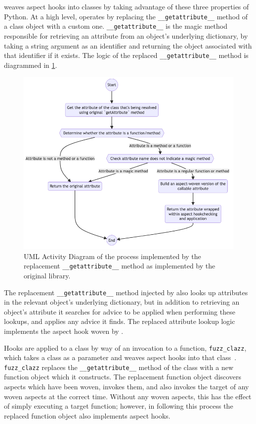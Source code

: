 \pdsf weaves aspect hooks into classes by taking advantage of these three
properties of Python. At a high level, \pdsf operates by replacing the
\lstinline{__getattribute__} method of a class object with a custom one.
\lstinline{__getattribute__} is the magic method responsible for retrieving an
attribute from an object's underlying dictionary, by taking a string argument as
an identifier and returning the object associated with that identifier if it
exists. The logic of the replaced \lstinline{__getattribute__} method is
diagrammed in \cref{fig:early_pdsf_replaced_getattr_diagram}.

\begin{figure}
\includegraphics[width=0.9\columnwidth]{30_prior_work/diagrams/replacement_getattr.png}
\caption{UML Activity Diagram of the process implemented by the replacement
\lstinline{__getattribute__} method as implemented by the original \pdsf{}
library.}
\label{fig:early_pdsf_replaced_getattr_diagram}
\end{figure}

The replacement \lstinline{__getattribute__} method injected by
\pdsf{} also looks up attributes in the relevant object's underlying dictionary,
but in addition to retrieving an object's attribute it searches for advice to be
applied when performing these lookups, and applies any advice it finds. The
replaced attribute lookup logic implements the aspect hook woven by \pdsf{}.

Hooks are applied to a class by way of an invocation to a function,
\lstinline{fuzz_clazz}, which takes a class as a parameter and weaves aspect
hooks into that class~\cite{pdsf_repo,asp_repo}. \lstinline{fuzz_clazz} replaces
the \lstinline{__getattribute__} method of the class with a new function
object which it constructs. The replacement function object discovers aspects
which have been woven, invokes them, and also invokes the target of any woven
aspects at the correct time. Without any woven aspects, this has the effect of
simply executing a target function; however, in following this process the
replaced function object also implements aspect hooks.

